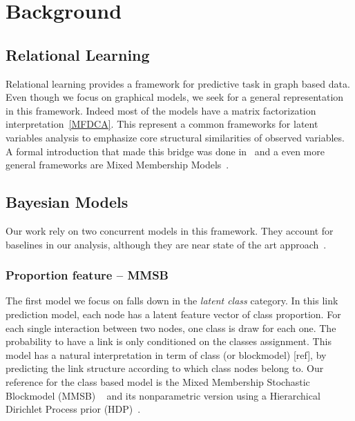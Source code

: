 \section{Background}

\subsection{Relational Learning}
Relational learning provides a framework for predictive task in graph based data. Even though we focus on  graphical models, we seek for a general representation in this framework. Indeed most of the models have a matrix factorization interpretation~\ref{MFDCA}. This represent a common frameworks for latent variables analysis to emphasize core structural similarities of observed variables. A formal introduction that made this bridge was done in~\cite{DCA} and a even more general frameworks 	are Mixed Membership Models~\cite{MMM}.


\subsection{Bayesian Models}
Our work rely on two concurrent models in this framework. They account for baselines in our analysis, although they are near state of the art approach~\cite{ILAM, EMMSB}.

\subsubsection{Proportion feature -- MMSB}
The first model we focus on falls down in the \emph{latent class} category. In this link prediction model, each node has a latent feature vector of class proportion. For each single interaction between two nodes, one class is draw for each one. The probability to have a link is only conditioned on the classes assignment. This model has a natural interpretation in term of class (or blockmodel) [ref], by predicting the link structure according to which class nodes belong to. Our reference for the class based model is the Mixed Membership Stochastic Blockmodel (MMSB) ~\cite{MMSB} and its nonparametric version using a Hierarchical Dirichlet Process prior (HDP)~\cite{HDP}.


